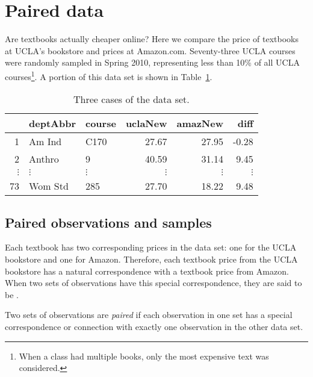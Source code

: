 \section{Paired data}
\label{pairedData}

Are textbooks actually cheaper online? Here we compare the price of textbooks at UCLA's bookstore and prices at Amazon.com. Seventy-three UCLA courses were randomly sampled in Spring 2010, representing less than 10\% of all UCLA courses\footnote{When a class had multiple books, only the most expensive text was considered.}. A portion of this  data set is shown in Table~\ref{textbooksDF}. \vspace{2.5mm}

\begin{table}[h]
\centering
\begin{tabular}{rllrrr}
  \hline
 & deptAbbr & course & uclaNew & amazNew & diff \\ 
  \hline
1 & Am Ind &  C170 & 27.67 & 27.95 & -0.28 \\ 
  2 & Anthro & 9 & 40.59 & 31.14 & 9.45 \\ 
$\vdots$ & $\vdots$ & $\vdots$ & $\vdots$ & $\vdots$ & $\vdots$ \\
  73 & Wom Std & 285 & 27.70 & 18.22 & 9.48 \\ 
   \hline
\end{tabular}
\caption{Three cases of the  data set.}
\label{textbooksDF}
\end{table}\vspace{-2.5mm}


\subsection{Paired observations and samples}

Each textbook has two corresponding prices in the data set: one for the UCLA bookstore and one for Amazon. Therefore, each textbook price from the UCLA bookstore has a natural correspondence with a textbook price from Amazon. When two sets of observations have this special correspondence, they are said to be .

\begin{termBox}{
Two sets of observations are \emph{paired} if each observation in one set has a special correspondence or connection with exactly one observation in the other data set.}
\end{termBox}

